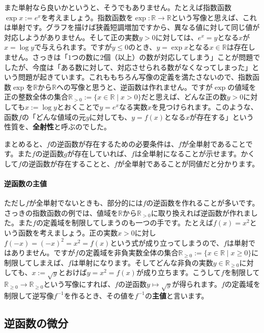 また単射なら良いかというと、そうでもありません。たとえば指数函数$\exp x:=e^x$を考えましょう。指数函数を$\exp\colon \mathbb{R}\rightarrow\mathbb{R}$という写像と思えば、これは単射です。グラフを描けば狭義短調増加ですから、異なる値に対して同じ値が対応しようがありません。そして正の実数$y>0$に対しては、$e^x = y$となる$x$が$x=\log y$で与えられます。ですが$y\leq 0$のとき、$y=\exp x$となる$x\in\mathbb{R}$は存在しません。さっきは「$1$つの数に$2$個（以上）の数が対応してしまう」ことが問題でしたが、今度は「ある数に対して、対応させられる数がなくなってしまった」という問題が起きています。これももちろん写像の定義を満たさないので、指数函数$\exp$を$\mathbb{R}$から$\mathbb{R}$への写像と思うと、逆函数は作れません。ですが$\exp$の値域を正の整数全体の集合$\mathbb{R}_{>0}:=\{x\in\mathbb{R} \mid x>0 \}$だと思えば、どんな正の数$y>0$に対しても$x:=\log y$とおくことで$y=e^x$なる実数$x$を見つけられます。このような、函数$f$の「どんな値域の元$y$に対しても、$y=f(x)$となる$x$が存在する」という性質を、\textbf{全射性}と呼ぶのでした。

まとめると、$f$の逆函数が存在するための必要条件は、$f$が全単射であることです。また$f$の逆函数$g$が存在していれば、$f$は全単射になることが示せます。かくして$f$の逆函数が存在することと、$f$が全単射であることが同値だと分かります。

\paragraph{逆函数の主値}

ただし$f$が全単射でないときも、部分的には$f$の逆函数を作れることが多いです。さっきの指数函数の例では、値域を$\mathbb{R}$から$\mathbb{R}_{>0}$に取り換えれば逆函数が作れました。また$f$の定義域を制限してしまうのも一つの手です。たとえば$f(x)=x^2$という函数を考えましょう。正の実数$x>0$に対し$f(-x)=(-x)^2=x^2=f(x)$という式が成り立ってしまうので、$f$は単射ではありません。ですが$f$の定義域を非負実数全体の集合$\mathbb{R}_{\geq 0}:=\{x\in\mathbb{R}\mid x\geq 0\}$に制限してしまえば、$f$は単射になります。そしてどんな非負の実数$y\in\mathbb{R}_{\geq 0}$に対しても、$x:=\sqrt{y}$とおけば$y=x^2=f(x)$が成り立ちます。こうして$f$を制限して$\mathbb{R}_{\geq 0}\rightarrow\mathbb{R}_{\geq 0}$という写像にすれば、$f$の逆函数$y\mapsto \sqrt{y}$が得られます。$f$の定義域を制限して逆写像$f^{-1}$を作るとき、その値を$f^{-1}$の\textbf{主値}と言います。

\subsection{逆函数の微分}

